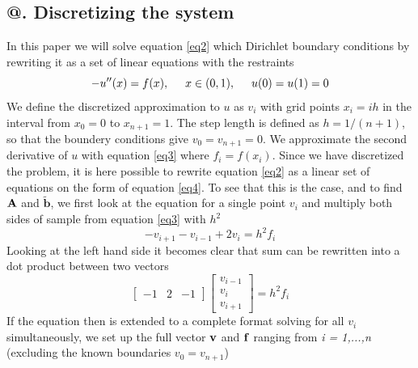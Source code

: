 \documentclass[%
reprint,
amsmath,amssymb,
aps,
]{revtex4-1}
\makeatletter
\newcommand*{\rom}[1]{\expandafter\@slowromancap\romannumeral #1@}
\makeatother
\begin{document}
\subsection*{\rom{1}. Discretizing the system}
\noindent In this paper we will solve equation \ref{eq2} which Dirichlet boundary conditions by rewriting it as a set of linear equations with the restraints
\begin{equation*} 
-u''(x) = f(x), \hspace{0.5cm} x\in(0,1), \hspace{0.5cm} u(0) = u(1) = 0
\end{equation*}
We define the discretized approximation to  $u$ as $v_i$  with 
grid points $x_i=ih$   in the interval from $x_0=0$ to $x_{n+1}=1$.
The step length is defined as $h=1/(n+1)$, so that the boundery conditions give $v_0 = v_{n+1} = 0$.
We  approximate the second derivative of $u$ with equation \ref{eq3} where $f_i=f(x_i)$. Since we have discretized the problem, it is here possible to rewrite equation \ref{eq2} as a linear set of equations on the form of equation \ref{eq4}. To see that this is the case, and to find $\bf{A}$ and $\tilde{\mathbf{b}}$, we first look at the equation for a single point $v_i$ and multiply both sides of sample from equation \ref{eq3} with $h^2$
\begin{equation*}
- v_{i+1} - v_{i-1} + 2v_i = h^2f_i
\end{equation*}
Looking at the left hand side it becomes clear that sum can be rewritten into a dot product between two vectors 
\begin{equation*}
\begin{bmatrix}
-1 & 2 &-1
\end{bmatrix}
\begin{bmatrix}
v_{i-1} \\ v_i \\ v_{i+1} 
\end{bmatrix} = h^2f_i
\end{equation*}
If the equation then is extended to a complete format solving for all $v_i$ simultaneously, we set up the full vector $\bf{v}$ and $\bf{f}$ ranging from \textit{i = 1,...,n} (excluding the known boundaries $v_0 = v_{n+1}$)
\end{document}
